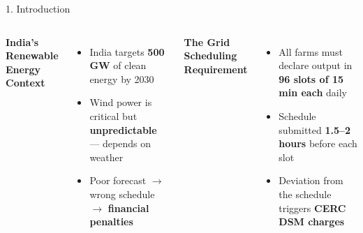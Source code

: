 \documentclass[aspectratio=169,10pt]{beamer}
\begin{document}
\begin{frame}{1. \; Introduction}
  \begin{columns}[T]
      \textbf{\color{darkblue}\small India's Renewable Energy Context}\\[5pt]
      \begin{itemize}\setlength\itemsep{5pt}\small
        \item India targets \textbf{500 GW} of clean energy by 2030
        \item Wind power is critical but \textbf{unpredictable} --- depends on weather
        \item Poor forecast $\rightarrow$ wrong schedule $\rightarrow$ \textbf{financial penalties}
      \end{itemize}
      \vspace{8pt}
      \textbf{\color{darkblue}\small The Grid Scheduling Requirement}\\[5pt]
      \begin{itemize}\setlength\itemsep{5pt}\small
        \item All farms must declare output in \textbf{96 slots of 15 min each} daily
        \item Schedule submitted \textbf{1.5--2 hours} before each slot
        \item Deviation from the schedule triggers \textbf{CERC DSM charges}
      \end{itemize}


\end{columns}
\end{frame}
\end{document}
